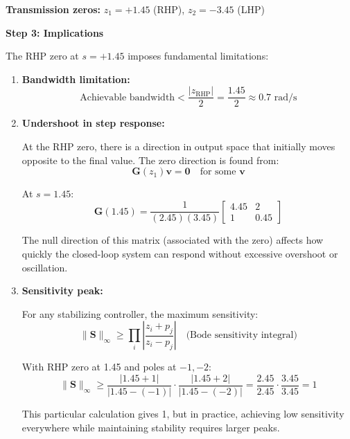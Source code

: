 \textbf{Transmission zeros:} $z_1 = +1.45$ (RHP), $z_2 = -3.45$ (LHP)

\textbf{Step 3: Implications}

The RHP zero at $s = +1.45$ imposes fundamental limitations:

\begin{enumerate}
\item \textbf{Bandwidth limitation:}
\begin{equation}
\text{Achievable bandwidth} < \frac{|z_{\text{RHP}}|}{2} = \frac{1.45}{2} \approx 0.7 \text{ rad/s}
\end{equation}

\item \textbf{Undershoot in step response:}

At the RHP zero, there is a direction in output space that initially moves opposite to the final value. The zero direction is found from:
\begin{equation}
\mathbf{G}(z_1) \mathbf{v} = \mathbf{0} \quad \text{for some } \mathbf{v}
\end{equation}

At $s = 1.45$:
\begin{equation}
\mathbf{G}(1.45) = \frac{1}{(2.45)(3.45)}\begin{bmatrix} 4.45 & 2 \\ 1 & 0.45 \end{bmatrix}
\end{equation}

The null direction of this matrix (associated with the zero) affects how quickly the closed-loop system can respond without excessive overshoot or oscillation.

\item \textbf{Sensitivity peak:}

For any stabilizing controller, the maximum sensitivity:
\begin{equation}
\|\mathbf{S}\|_\infty \geq \prod_{i} \left|\frac{z_i + p_j}{z_i - p_j}\right| \quad \text{(Bode sensitivity integral)}
\end{equation}

With RHP zero at 1.45 and poles at $-1, -2$:
\begin{equation}
\|\mathbf{S}\|_\infty \geq \frac{|1.45 + 1|}{|1.45 - (-1)|} \cdot \frac{|1.45 + 2|}{|1.45 - (-2)|} = \frac{2.45}{2.45} \cdot \frac{3.45}{3.45} = 1
\end{equation}

This particular calculation gives 1, but in practice, achieving low sensitivity everywhere while maintaining stability requires larger peaks.
\end{enumerate}

